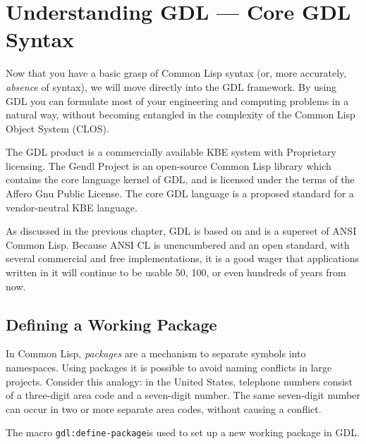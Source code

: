 \documentclass [11pt]{book}
\begin{document}
\chapter{Understanding GDL --- Core GDL Syntax}

\label{chap:understandinggdl---coregdlsyntax}



Now that you have a basic grasp of Common Lisp syntax (or, more accurately, \emph{absence} of syntax), we will move directly into the GDL
framework. By using GDL you can formulate most of your engineering and
computing problems in a natural way, without becoming entangled in the
complexity of the Common Lisp Object System (CLOS).



The GDL product is a commercially available KBE system with
Proprietary licensing.  The Gendl Project is an open-source Common
Lisp library which contains the core language kernel of GDL, and is
licensed under the terms of the Affero Gnu Public License. The core
GDL language is a proposed standard for a vendor-neutral KBE
language.



As discussed in the previous chapter, GDL is based on and
is a superset of ANSI Common Lisp. Because ANSI CL is unencumbered and
an open standard, with several commercial and free implementations, it
is a good wager that applications written in it will continue to be
usable 50, 100, or even hundreds of years from now.



\section{Defining a Working Package}

\label{sec:definingaworkingpackage}



In Common Lisp, \emph{packages} are a mechanism to separate symbols into
namespaces. Using packages it is possible to avoid naming conflicts in
large projects. Consider this analogy: in the United States, telephone
numbers consist of a three-digit area code and a seven-digit
number. The same seven-digit number can occur in two or more separate
area codes, without causing a conflict.



The macro \texttt{gdl:define-package}is used to set up a new working package in GDL.
\end{document}

